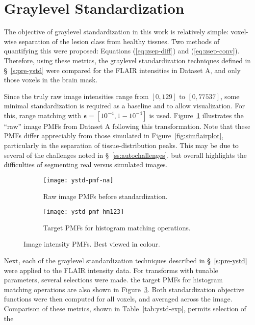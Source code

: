 \section{Graylevel Standardization}\label{ss:exp-ystd-jsep}
The objective of graylevel standardization in this work is relatively simple:
voxel-wise separation of the lesion class from healthy tissues.
Two methods of quantifying this were proposed:
Equations (\ref{eq:zsep-diff}) and (\ref{eq:zsep-conv}).
Therefore, using these metrics,
the graylevel standardization techniques defined in \S~\ref{s:pre-ystd} were compared
for the FLAIR intensities in Dataset A, and only those voxels in the brain mask.
\par
Since the truly raw image intensities range from $[0,129]$ to $[0,77537]$,
some minimal standardization is required as a baseline and to allow visualization.
For this, range matching with $\bm{\epsilon} = [10^{-4},1-10^{-4}]$ is used.
Figure~\ref{fig:ystd-pmf-raw} illustrates the ``raw'' image PMFs from Dataset A
following this transformation.
Note that these PMFs differ appreciably from those simulated in Figure~\ref{fig:simflairplot},
particularly in the separation of tissue-distribution peaks.
This may be due to several of the challenges noted in \S~\ref{ss:autochallenges},
but overall highlights the difficulties of segmenting real versus simulated images.
\par
\begin{figure}
  \begin{subfigure}{0.495\textwidth}
    \centering
    \texttt{[image: ystd-pmf-na]}
    \caption{Raw image PMFs before standardization.}%
    \label{fig:ystd-pmf-raw}
  \end{subfigure}
  \begin{subfigure}{0.495\textwidth}
    \centering
    \texttt{[image: ystd-pmf-hm123]}
    \caption{Target PMFs for histogram matching operations.}%
    \label{fig:ystd-pmf-target}
  \end{subfigure}
  \caption{Image intensity PMFs. Best viewed in colour.}
\end{figure}
Next, each of the graylevel standardization techniques described in \S~\ref{s:pre-ystd}
were applied to the FLAIR intensity data.
For transforms with tunable parameters, several selections were made.
the target PMFs for histogram matching operations are also shown in Figure~\ref{fig:ystd-pmf-target}.
Both standardization objective functions were then computed for all voxels,
and averaged across the image.
Comparison of these metrics, shown in Table~\ref{tab:ystd-exp}, permits selection of the
